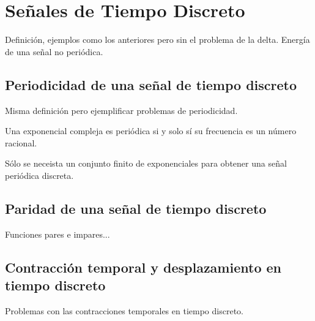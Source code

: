 \section{Señales de Tiempo Discreto}

Definición, ejemplos como los anteriores pero sin el problema de la delta. Energía de una señal no periódica.

\subsection{Periodicidad de una señal de tiempo discreto}

Misma definición pero ejemplificar problemas de periodicidad.

\begin{example}
    Una exponencial compleja es periódica si y solo sí su frecuencia es un número racional.
\end{example}

\begin{example}
    Sólo se neceista un conjunto finito de exponenciales para obtener una señal periódica discreta.
\end{example}

\subsection{Paridad de una señal de tiempo discreto}

Funciones pares e impares...

\subsection{Contracción temporal y desplazamiento en tiempo discreto}

Problemas con las contracciones temporales en tiempo discreto.
